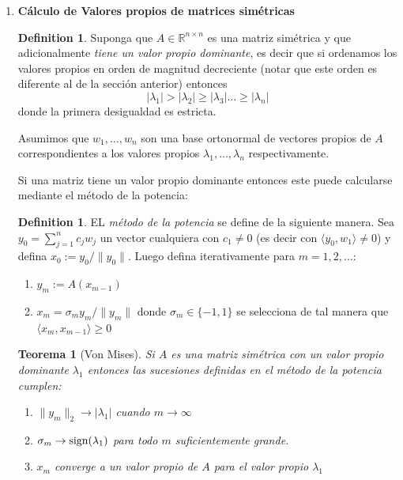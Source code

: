 \documentclass[12pt]{amsart}
\newtheorem{theorem}[lemma]{Teorema}
\theoremstyle{definition}
\newtheorem{definition}[lemma]{Definition}
\renewcommand{\geq}{\geqslant}
\newcommand{\RR}{\ensuremath{\mathbb{R}}}
\begin{document}
\begin{enumerate}
{\begin{enumerate}
\end{enumerate}

}


\item {\bf Cálculo de Valores propios de matrices simétricas}

\begin{definition}
Suponga que $A\in \RR^{n\times n}$ es una matriz simétrica y que adicionalmente \emph{tiene un valor propio dominante}, es decir que si ordenamos los valores propios en orden de magnitud decreciente (notar que este orden es diferente al de la sección anterior) entonces
\[|\lambda_1|>|\lambda_2|\geq |\lambda_3|\dots \geq |\lambda_n|\]
donde la primera desigualdad es estricta.
\end{definition}
Asumimos que $w_1,\dots, w_n$ son una base ortonormal de vectores propios de $A$ correspondientes a los valores propios $\lambda_1,\dots, \lambda_n$ respectivamente.


Si una matriz tiene un valor propio dominante entonces este puede calcularse mediante el método de la potencia:
\begin{definition} EL \emph{método de la potencia} se define de la siguiente manera. Sea $y_0=\sum_{j=1}^n c_jw_j$ un vector cualquiera con $c_1\neq 0$  (es decir con $\langle y_0,w_1\rangle\neq 0$) y defina $x_0:=y_0/\|y_0\|$. Luego defina iterativamente para $m=1,2,\dots$:
\begin{enumerate}
\item $y_m:=A(x_{m-1})$
\item $x_m= \sigma_my_m/\|y_m\|$ donde $\sigma_m\in \{-1,1\}$ se selecciona de tal manera que $\langle x_m,x_{m-1}\rangle \geq 0$
\end{enumerate}
\end{definition}


\begin{theorem} [Von Mises] Si $A$ es una matriz simétrica con un valor propio dominante $\lambda_1$ entonces las sucesiones definidas en el método de la potencia cumplen:
\begin{enumerate}
\item $\|y_m\|_2\rightarrow |\lambda_1|$ cuando $m\rightarrow \infty$
\item $\sigma_m\rightarrow {\rm sign}(\lambda_1)$ para todo $m$ suficientemente grande.
\item $x_m$ converge a un valor propio de $A$ para el valor propio $\lambda_1$
\end{enumerate}
\end{theorem}


\end{enumerate}
\end{document}

